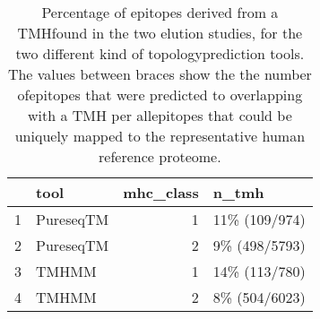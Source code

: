 \begin{table}[ht]
\centering
\begin{tabular}{rlrl}
  \hline
 & tool & mhc\_class & n\_tmh \\ 
  \hline
1 & PureseqTM &   1 & 11\% (109/974) \\ 
  2 & PureseqTM &   2 & 9\% (498/5793) \\ 
  3 & TMHMM &   1 & 14\% (113/780) \\ 
  4 & TMHMM &   2 & 8\% (504/6023) \\ 
   \hline
\end{tabular}
\caption{Percentage of epitopes derived from a TMHfound in the two elution studies, for the two different kind of topologyprediction tools. The values between braces show the the number ofepitopes that were predicted to overlapping with a TMH per allepitopes that could be uniquely mapped to the representative human reference proteome.} 
\label{tab:elution}
\end{table}
